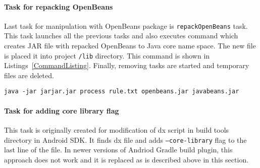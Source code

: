 \paragraph{Task for repacking OpenBeans}
Last task for manipulation with OpenBeans package is \texttt{repackOpenBeans} task. This task launches all the previous
tasks and also executes command which creates JAR file with repacked OpenBeans to Java core name space. The new file is
placed it into project \texttt{/lib} directory. This command is shown in Listings~\ref{CommandListing}. Finally,
removing tasks are started and temporary files are deleted.
\\
\begin{lstlisting}[captionpos={b},caption={Command for repacking openbeans.jar file.},frame={lines},
label={CommandListing},basicstyle=\footnotesize]
java -jar jarjar.jar process rule.txt openbeans.jar javabeans.jar
\end{lstlisting}

\paragraph{Task for adding core library flag}
This task is originally created for modification of dx script in build tools directory in Android SDK. It finds dx file
and adds \texttt{--core-library} flag to the last line of the file. In newer versions of Andriod Gradle build plugin,
this approach does not work and it is replaced as is described above in this section.
